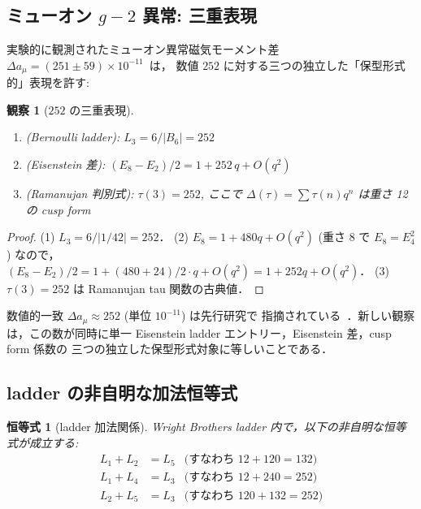 \documentclass[11pt,a4paper]{article}
\newtheorem{observation}{観察}
\newtheorem{identity}{恒等式}
\begin{document}
\subsection{ミューオン $g-2$ 異常: 三重表現}

実験的に観測されたミューオン異常磁気モーメント差
$\Delta a_\mu = (251 \pm 59)\times 10^{-11}$~\cite{MuonG2FNAL, BMW2021}は，
数値 $252$ に対する三つの独立した「保型形式的」表現を許す:

\begin{observation}[$252$ の三重表現]
\label{obs:muon}
\begin{enumerate}
\item (Bernoulli ladder): $L_3 = 6/|B_6| = 252$
\item (Eisenstein 差):
$(E_8 - E_2)/2 = 1 + 252\,q + O(q^2)$
\item (Ramanujan 判別式): $\tau(3) = 252$, ここで
$\Delta(\tau) = \sum \tau(n)q^n$ は重さ 12 の cusp form
\end{enumerate}
\end{observation}

\begin{proof}
(1) $L_3 = 6/|1/42| = 252$．
(2) $E_8 = 1 + 480q + O(q^2)$ (重さ 8 で $E_8 = E_4^2$) なので，
$(E_8 - E_2)/2 = 1 + (480+24)/2 \cdot q + O(q^2) = 1 + 252q + O(q^2)$．
(3) $\tau(3) = 252$ は Ramanujan tau 関数の古典値．
\end{proof}

数値的一致 $\Delta a_\mu \approx 252$ (単位 $10^{-11}$) は先行研究で
指摘されている~\cite{wb-prior}．新しい観察は，この数が同時に単一
Eisenstein ladder エントリー，Eisenstein 差，cusp form 係数の
三つの独立した保型形式対象に等しいことである．

\subsection{ladder の非自明な加法恒等式}

\begin{identity}[ladder 加法関係]
\label{id:additive}
Wright Brothers ladder 内で，以下の非自明な恒等式が成立する:
\begin{align}
L_1 + L_2 &= L_5 &\text{(すなわち $12 + 120 = 132$)} \\
L_1 + L_4 &= L_3 &\text{(すなわち $12 + 240 = 252$)} \\
L_2 + L_5 &= L_3 &\text{(すなわち $120 + 132 = 252$)}
\end{align}
\end{identity}
\end{document}
